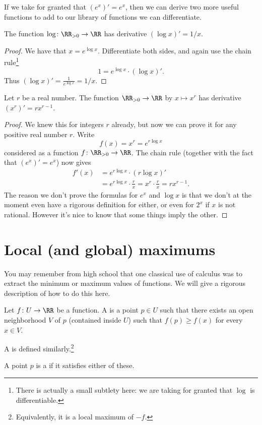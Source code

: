 If we take for granted that $(e^x)' = e^x$,
then we can derive two more useful functions
to add to our library of functions we can differentiate.

\begin{corollary}
	The function $\log \colon \RR_{>0} \to \RR$
	has derivative $(\log x)' = 1/x$.
\end{corollary}
\begin{proof}
	We have that $x = e^{\log x}$.
	Differentiate both sides, and again use the chain rule\footnote{There
		is actually a small subtlety here:
		we are taking for granted that $\log$ is differentiable.}
	\[ 1 = e^{\log x} \cdot (\log x)'. \]
	Thus $(\log x)' = \frac{1}{e^{\log x}} = 1/x$.
\end{proof}

\begin{corollary}
	Let $r$ be a real number.
	The function $\RR_{>0} \to \RR$ by $x \mapsto x^r$
	has derivative $(x^r)' = rx^{r-1}$.
\end{corollary}

\begin{proof}
	We knew this for integers $r$ already,
	but now we can prove it for any positive real number $r$.
	Write
	\[ f(x) = x^r = e^{r \log x} \]
	considered as a function $f \colon \RR_{>0} \to \RR$.
	The chain rule (together with the fact that $(e^x)' = e^x$)
	now gives
	\begin{align*}
		f'(x) &= e^{r \log x} \cdot (r \log x)' \\
		&= e^{r \log x} \cdot \frac rx = x^r \cdot \frac rx = rx^{r-1}.
	\end{align*}
	The reason we don't prove the formulas for $e^x$ and $\log x$
	is that we don't at the moment even have a rigorous
	definition for either, or even for $2^x$ if $x$ is not rational.
	However it's nice to know that some things imply the other.
\end{proof}

\section{Local (and global) maximums}
You may remember from high school
that one classical use of calculus
was to extract the minimum or maximum values of functions.
We will give a rigorous description of how to do this here.

\begin{definition}
	Let $f \colon U \to \RR$ be a function.
	A  is a point $p \in U$
	such that there exists an open neighborhood $V$ of $p$ (contained inside $U$)
	such that $f(p) \ge f(x)$ for every $x \in V$.

	A  is defined similarly.\footnote{Equivalently,
		it is a local maximum of $-f$.}
\end{definition}
\begin{definition}
	A point $p$ is a 
	if it satisfies either of these.
\end{definition}

